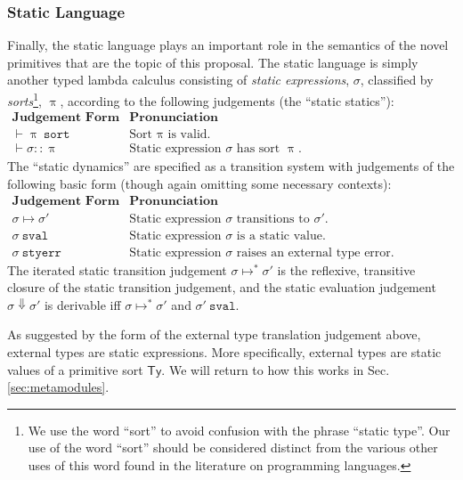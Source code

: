 \subsubsection{Static Language}
Finally, the static language plays an important role in the semantics of the novel primitives that are the topic of this proposal. The static language is simply another typed lambda calculus consisting of \emph{static expressions}, $\sigma$, classified by \emph{sorts}\footnote{We use the word ``sort'' to avoid confusion with the phrase ``static type''. Our use of the  word ``sort'' should be considered distinct from the various other uses of this word found in the literature on programming languages.}, $\uppi$, according to the following judgements (the ``static statics''):
\\[1ex]
$
\begin{array}{ll}
\textbf{Judgement Form} & \textbf{Pronunciation}\\
\vdash \uppi~\mathtt{sort} & \text{Sort $\uppi$ is valid.}\\
\vdash \sigma :: \uppi & \text{Static expression $\sigma$ has sort $\uppi$.}
\end{array}
$\\

\noindent
The ``static dynamics'' are specified as a transition system with judgements of the following basic form (though again omitting some necessary contexts):
\\[1ex]
$
\begin{array}{ll}
\textbf{Judgement Form} & \textbf{Pronunciation}\\
\sigma \mapsto \sigma' & \text{Static expression $\sigma$ transitions to $\sigma'$.}\\
\sigma~\mathtt{sval} & \text{Static expression $\sigma$ is a static value.}\\
\sigma~\mathtt{styerr} & \text{Static expression $\sigma$ raises an external type error.}
\end{array}
$
\\[1ex]
The iterated static transition judgement $\sigma \mapsto^{*} \sigma'$ is the reflexive, transitive closure of the static transition judgement, and the static evaluation judgement $\sigma \Downarrow \sigma'$ is derivable iff $\sigma \mapsto^{*} \sigma'$ and $\sigma'~\mathtt{sval}$. 

As suggested by the form of the external type translation judgement above, external types are static expressions. More specifically, external types are static values of a primitive sort $\mathsf{Ty}$. We will return to how this works in Sec. \ref{sec:metamodules}. 


